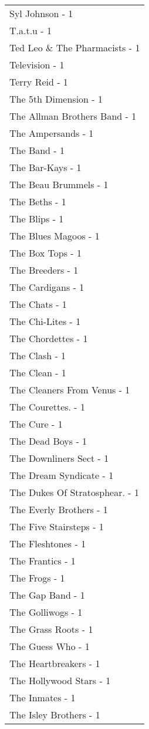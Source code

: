 \documentclass[
]{article}
\begin{document}
\begin{longtable}{l}
Syl Johnson - 1 \\ 
T.a.t.u - 1 \\ 
Ted Leo \& The Pharmacists - 1 \\ 
Television - 1 \\ 
Terry Reid - 1 \\ 
The 5th Dimension - 1 \\ 
The Allman Brothers Band - 1 \\ 
The Ampersands - 1 \\ 
The Band - 1 \\ 
The Bar-Kays - 1 \\ 
The Beau Brummels - 1 \\ 
The Beths - 1 \\ 
The Blips - 1 \\ 
The Blues Magoos - 1 \\ 
The Box Tops - 1 \\ 
The Breeders - 1 \\ 
The Cardigans - 1 \\ 
The Chats - 1 \\ 
The Chi-Lites - 1 \\ 
The Chordettes - 1 \\ 
The Clash - 1 \\ 
The Clean - 1 \\ 
The Cleaners From Venus - 1 \\ 
The Courettes. - 1 \\ 
The Cure - 1 \\ 
The Dead Boys - 1 \\ 
The Downliners Sect - 1 \\ 
The Dream Syndicate - 1 \\ 
The Dukes Of Stratosphear. - 1 \\ 
The Everly Brothers - 1 \\ 
The Five Stairsteps - 1 \\ 
The Fleshtones - 1 \\ 
The Frantics - 1 \\ 
The Frogs - 1 \\ 
The Gap Band - 1 \\ 
The Golliwogs - 1 \\ 
The Grass Roots - 1 \\ 
The Guess Who - 1 \\ 
The Heartbreakers - 1 \\ 
The Hollywood Stars - 1 \\ 
The Inmates - 1 \\ 
The Isley Brothers - 1 \\ 

\end{longtable}
\end{document}
